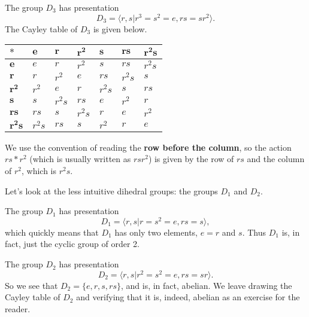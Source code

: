 \begin{example}\label{example-presentation-of-D3}
    The group $D_3$ has presentation
    \[
        D_3 = \langle r, s \vert r^3 = s^2 = e, rs = sr^2 \rangle.
    \]
    The Cayley table of $D_3$ is given below.

    \begin{table}[h]
        \centering
        \begin{tabular}{|l|l|l|l|l|l|l|}
        \hline
        $\boldsymbol{\ast}$ & $\boldsymbol{e}$ & $\boldsymbol{r}$ & $\boldsymbol{r^2}$ & $\boldsymbol{s}$ & $\boldsymbol{rs}$ & $\boldsymbol{r^2s}$ \\ \hline
        $\boldsymbol{e}$    & $e$    & $r$    & $r^2$  & $s$    & $rs$   & $r^2s$ \\ \hline
        $\boldsymbol{r}$    & $r$    & $r^2$  & $e$    & $rs$   & $r^2s$ & $s$    \\ \hline
        $\boldsymbol{r^2}$  & $r^2$  & $e$    & $r$    & $r^2s$ & $s$    & $rs$   \\ \hline
        $\boldsymbol{s}$    & $s$    & $r^2s$ & $rs$   & $e$    & $r^2$  & $r$    \\ \hline
        $\boldsymbol{rs}$   & $rs$   & $s$    & $r^2s$ & $r$    & $e$    & $r^2$  \\ \hline
        $\boldsymbol{r^2s}$ & $r^2s$ & $rs$   & $s$    & $r^2$  & $r$    & $e$    \\ \hline
        \end{tabular}
    \end{table}

    We use the convention of reading the \textbf{row before the column}, so the action $rs \ast r^2$ (which is usually written as $rsr^2$) is given by the row of $rs$ and the column of $r^2$, which is $r^2s$.
\end{example}

Let's look at the less intuitive dihedral groups: the groups $D_1$ and $D_2$.
\begin{example}
    The group $D_1$ has presentation
    \[
        D_1 = \langle r, s \vert r = s^2 = e, rs = s \rangle,
    \]
    which quickly means that $D_1$ has only two elements, $e = r$ and $s$. Thus $D_1$ is, in fact, just the cyclic group of order 2.
\end{example}

\begin{example}
    The group $D_2$ has presentation
    \[
        D_2 = \langle r, s \vert r^2 = s^2 = e, rs = sr \rangle.
    \]
    So we see that $D_2 = \{e, r, s, rs\}$, and is, in fact, abelian. We leave drawing the Cayley table of $D_2$ and verifying that it is, indeed, abelian as an exercise for the reader.
\end{example}

